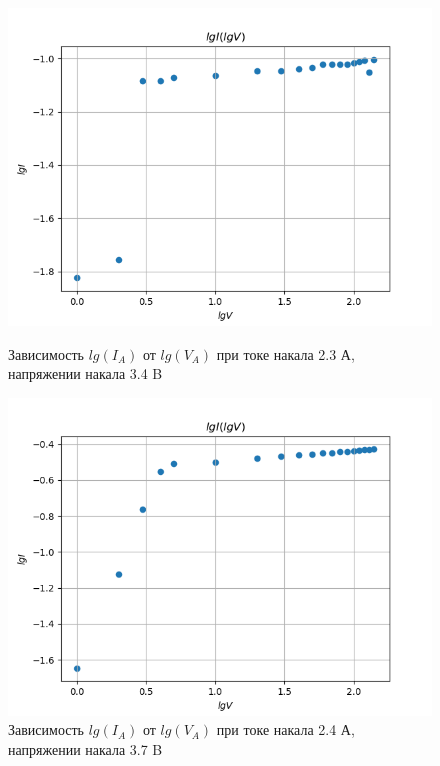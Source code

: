\documentclass[a4paper]{article}
\begin{document}
\begin{figure}[h]
\begin{center}
\begin{minipage}[h]{0.45\linewidth}
\includegraphics[width=1\linewidth]{./Diode/graph_1.png}
\caption{Зависимость $lg(I_A)$ от $lg(V_A)$ при токе накала 2.3 А, напряжении накала 3.4 B} %
\end{minipage}
\hfill 
\begin{minipage}[h]{0.45\linewidth}
\includegraphics[width=1\linewidth]{./Diode/graph_2.png}
\caption{Зависимость $lg(I_A)$ от $lg(V_A)$ при токе накала 2.4 А, напряжении накала 3.7 B }
\label{ris:experimcoded}
\end{minipage}
\end{center}
\end{figure}
\end{document}
